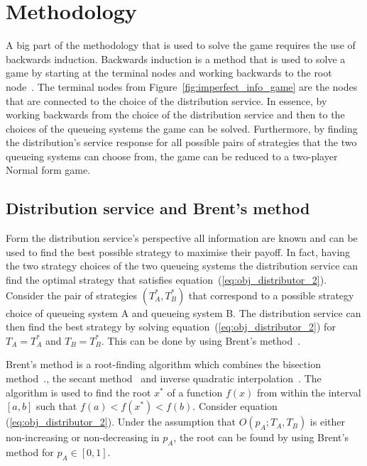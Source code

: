 \section{Methodology}

A big part of the methodology that is used to solve the game requires the use of
backwards induction.
Backwards induction is a method that is used to solve a game by starting at the
terminal nodes and working backwards to the root node~\cite{watson2002strategy}.
The terminal nodes from Figure~\ref{fig:imperfect_info_game} are the nodes that
are connected to the choice of the distribution service.
In essence, by working backwards from the choice of the distribution service
and then to the choices of the queueing systems the game can be solved.
Furthermore, by finding the distribution's service response for all possible
pairs of strategies that the two queueing systems can choose from, the game can
be reduced to a two-player Normal form game.


\subsection{Distribution service and Brent's method}
\label{sec:best_response_distribution_service}

Form the distribution service's perspective all information are known and can be
used to find the best possible strategy to maximise their payoff.
In fact, having the two strategy choices of the two queueing systems the
distribution service can find the optimal strategy that satisfies
equation~(\ref{eq:obj_distributor_2}).
Consider the pair of strategies \((T_A^*, T_B^*)\) that correspond to a possible
strategy choice of queueing system A and queueing system B.
The distribution service can then find the best strategy by solving
equation~(\ref{eq:obj_distributor_2}) for \(T_A = T_A^*\) and \(T_B = T_B^*\).
This can be done by using Brent's method~\cite{brent_method}.

Brent's method is a root-finding algorithm which combines the bisection
method~\cite{corliss1977root}., the secant method~\cite{secantmethod} and
inverse quadratic interpolation~\cite{epperson2021introduction}.
The algorithm is used to find the root \(x^*\) of a function \(f(x)\) from
within the interval \([a, b]\) such that \(f(a) < f(x^*) < f(b)\).
Consider equation (\ref{eq:obj_distributor_2}).
Under the assumption that \(O(p_A; T_A, T_B)\) is either non-increasing or
non-decreasing in \(p_A\), the root can be found by using Brent's method
for \(p_A \in [0, 1]\).

